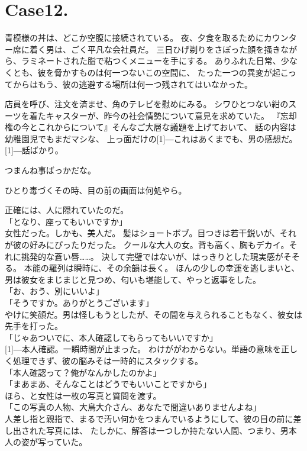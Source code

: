 \documentclass[../NenokuniMain]{subfiles}
\begin{document}
\section{Case12.}
青模様の丼は、どこか空腹に接続されている。
夜、夕食を取るためにカウンター席に着く男は、ごく平凡な会社員だ。
三日ひげ剃りをさぼった顔を掻きながら、ラミネートされた脂で粘つくメニューを手にする。
ありふれた日常、少なくとも、彼を脅かすものは何一つないこの空間に、
たった一つの異変が起こってからはもう、彼の逃避する場所は何一つ残されてはいなかった。

店員を呼び、注文を済ませ、角のテレビを慰めにみる。
シワひとつない紺のスーツを着たキャスターが、昨今の社会情勢について意見を求めていた。
『忘却権の今とこれからについて』そんなご大層な議題を上げておいて、
話の内容は幼稚園児でもまだマシな、
上っ面だけの\scalebox{2}[1]{―}これはあくまでも、男の感想だ。\scalebox{2}[1]{―}話ばかり。

つまんね事ばっかだな。

ひとり毒づくその時、目の前の画面は何処やら。

正確には、人に隠れていたのだ。\\
「となり、座ってもいいですか」\\
女性だった。しかも、美人だ。
髪はショートボブ。目つきは若干鋭いが、それが彼の好みにぴったりだった。
クールな大人の女。背も高く、胸もデカイ。それに挑発的な蒼い唇……。
決して完璧ではないが、はっきりとした現実感がそそる。
本能の羅列は瞬時に、その余韻は長く。
ほんの少しの幸運を逃しまいと、男は彼女をまじまじと見つめ、匂いも堪能して、やっと返事をした。\\
「お、おう、別にいいよ」\\
「そうですか。ありがとうございます」\\
やけに笑顔だ。男は怪しもうとしたが、その間を与えられることもなく、彼女は先手を打った。\\
「じゃあついでに、本人確認してもらってもいいですか」\\
\scalebox{2}[1]{―}本人確認。一瞬時間が止まった。
わけががわからない。単語の意味を正しく処理できず、彼の脳みそは一時的にスタックする。\\
「本人確認って？俺がなんかしたのかよ」\\
「まあまあ、そんなことはどうでもいいことですから」\\
ほら、と女性は一枚の写真と質問を渡す。\\
「この写真の人物、大鳥大介さん、あなたで間違いありませんよね」\\
人差し指と親指で、まるで汚い何かをつまんでいるようにして、彼の目の前に差し出された写真には、
たしかに、解答は一つしか持たない人間、つまり、男本人の姿が写っていた。
\end{document}
